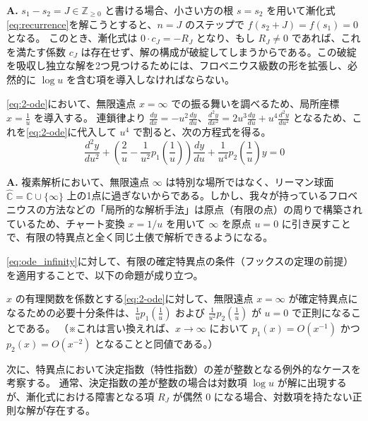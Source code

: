 \begin{Q}
\textbf{A.} $s_{1} - s_{2} = J \in \mathbb{Z}_{\ge 0}$ と書ける場合、小さい方の根 $s=s_{2}$ を用いて漸化式\eqref{eq:recurrence}を解こうとすると、$n=J$ のステップで $f(s_2+J) = f(s_1) = 0$ となる。
このとき、漸化式は $0 \cdot c_{J} = -R_J$ となり、もし $R_J \neq 0$ であれば、これを満たす係数 $c_{J}$ は存在せず、解の構成が破綻してしまうからである。この破綻を吸収し独立な解を2つ見つけるためには、フロベニウス級数の形を拡張し、必然的に $\log u$ を含む項を導入しなければならない。
\end{Q}
\eqref{eq:2-ode}において、無限遠点 $x=\infty$ での振る舞いを調べるため、局所座標 $x = \frac{1}{u}$ を導入する。
連鎖律より $\frac{dy}{dx} = -u^{2}\frac{dy}{du}$、$\frac{d^{2}y}{dx^{2}} = 2u^{3}\frac{dy}{du} + u^{4}\frac{d^{2}y}{du^{2}}$ となるため、これを\eqref{eq:2-ode}に代入して $u^{4}$ で割ると、次の方程式を得る。
\begin{equation}\label{eq:ode_infinity}
\frac{d^{2}y}{du^{2}} + \left(\frac{2}{u} - \frac{1}{u^{2}}p_{1}\left(\frac{1}{u}\right)\right)\frac{dy}{du} + \frac{1}{u^{4}}p_{2}\left(\frac{1}{u}\right)y = 0
\end{equation}

\begin{Q}[【核心】なぜ $x=\infty$ の特異性を調べるのに、わざわざ $x=1/u$ という変換を行って $u=0$ での振る舞いを見るのか？]
\textbf{A.} 複素解析において、無限遠点 $\infty$ は特別な場所ではなく、リーマン球面 $\hat{\mathbb{C}} = \mathbb{C} \cup \{\infty\}$ 上の1点に過ぎないからである。しかし、我々が持っているフロベニウスの方法などの「局所的な解析手法」は原点（有限の点）の周りで構築されているため、チャート変換 $x=1/u$ を用いて $\infty$ を原点 $u=0$ に引き戻すことで、有限の特異点と全く同じ土俵で解析できるようになる。
\end{Q}

\eqref{eq:ode_infinity}に対して、有限の確定特異点の条件（フックスの定理の前提）を適用することで、以下の命題が成り立つ。

\begin{proposition}\label{prop:regular_infinity}
$x$ の有理関数を係数とする\eqref{eq:2-ode}に対して、無限遠点 $x=\infty$ が確定特異点になるための必要十分条件は、$\frac{1}{u}p_{1}\left(\frac{1}{u}\right)$ および $\frac{1}{u^{2}}p_{2}\left(\frac{1}{u}\right)$ が $u=0$ で正則になることである。
（※これは言い換えれば、$x \to \infty$ において $p_{1}(x) = O(x^{-1})$ かつ $p_{2}(x) = O(x^{-2})$ となることと同値である。）
\end{proposition}
次に、特異点において決定指数（特性指数）の差が整数となる例外的なケースを考察する。
通常、決定指数の差が整数の場合は対数項 $\log u$ が解に出現するが、漸化式における障害となる項 $R_J$ が偶然 $0$ になる場合、対数項を持たない正則な解が存在する。

